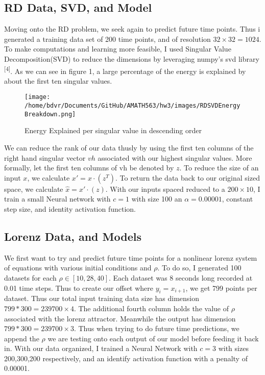 \documentclass[12pt]{article}
\begin{document}
\subsection{RD Data, SVD, and Model}
Moving onto the RD problem, we seek again to predict future time points. Thus i generated a training data set of 200 time points, and of resolution $32\times 32 = 1024$. To make computations and learning more feasible, I used Singular Value Decomposition(SVD) to reduce the dimensions by leveraging numpy's svd library \textsuperscript{[4]}. As we can see in figure 1, a large percentage of the energy is explained by about the first ten singular values. 
\begin{wrapfigure}[11]{l}{2.1in}
	\texttt{[image: /home/bdvr/Documents/GitHub/AMATH563/hw3/images/RDSVDEnergyBreakdown.png]}
	\caption{Energy Explained per singular value in descending order}
\end{wrapfigure}
We can reduce the rank of our data thusly by using the first ten columns of the right hand singular vector $vh$ associated with our highest singular values. More formally, let the first ten columns of vh be denoted by $z$. To reduce the size of an input $x$, we calculate $x'=x\cdot(z^T)$. To return the data back to our original sized space, we calculate $\hat{x} = x'\cdot(z)$. With our inputs spaced reduced to a $200\times 10$, I train a small Neural network with $c=1$ with size 100 an $\alpha = 0.00001$, constant step size, and identity activation function.

\subsection{Lorenz Data, and Models}
We first want to try and predict future time points for a nonlinear lorenz system of equations with various initial conditions and $\rho$. To do so, I generated 100 datasets for each $\rho \in [10,28,40]$. Each dataset was 8 seconds long recorded at 0.01 time steps. Thus to create our offset where  $y_i = x_{i+1}$, we get 799 points per dataset. Thus our total input training data size has dimension $799*300=239700\times 4$. The additional fourth column holds the value of $\rho$ associated with the lorenz attractor. Meanwhile the output has dimension$799*300=239700\times 3$. Thus when trying to do future time predictions, we append the $\rho$ we are testing onto each output of our model before feeding it back in. With our data organized, I trained a Neural Network with $c=3$ with sizes 200,300,200 respectively, and an identify activation function with a penalty of 0.00001.
\end{document}
